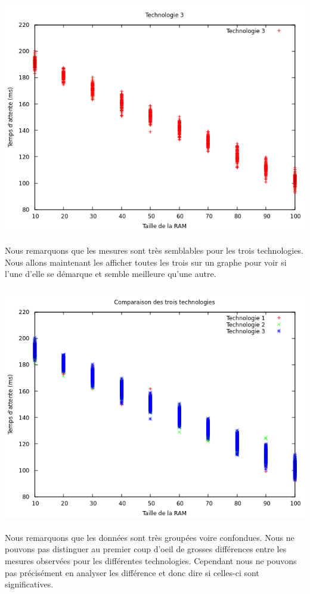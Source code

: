 \documentclass[a4paper,10pt]{article}
\begin{document}
\includegraphics[scale=0.6]{img/techno3_plot.png}
\\
\\
Nous remarquons que les mesures sont très semblables pour les trois technologies. Nous allons maintenant les afficher toutes les trois sur un graphe pour voir
si l'une d'elle se démarque et semble meilleure qu'une autre.
\\
\\
\includegraphics[scale=0.6]{img/techno_plot.png}
\\
\\
Nous remarquons que les données sont très groupées voire confondues. Nous ne pouvons pas distinguer au premier coup d'oeil de grosses différences entre les mesures observées
pour les différentes technologies. Cependant nous ne pouvons pas précisément en analyser les différence et donc dire si celles-ci sont significatives.
\end{document}
